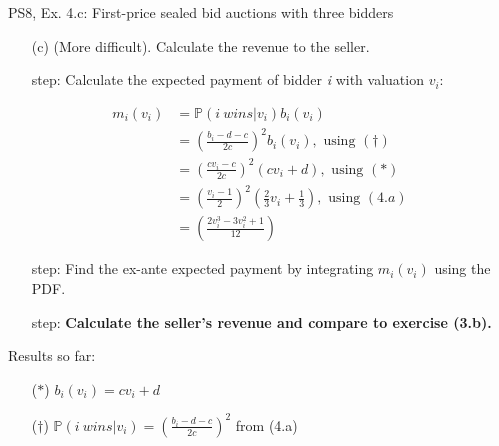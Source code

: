 \begin{frame}{PS8, Ex. 4.c: First-price sealed bid auctions with three bidders}
    \begin{itemize}
      \item[(c)] (More difficult). Calculate the revenue to the seller.
    \end{itemize}
    \vspace{-8pt}
    \begin{multicols}{2}
      \begin{itemize}
        \item[\nth{1} step:] Calculate the expected payment of bidder \textit{i} with valuation $v_i$:
      \end{itemize}
      \vspace{-10pt}
      \begin{align*}
        m_i(v_i)&=\mathbb{P}(i\ wins|v_i)b_i(v_i)\\
                &=\left(\frac{b_i-d-c}{2c}\right)^2b_i(v_i),\text{ using }(\dagger)\\
                &=\left(\frac{cv_i-c}{2c}\right)^2(cv_i+d),\text{ using }(*)\\
                &=\left(\frac{v_i-1}{2}\right)^2\left(\frac{2}{3}v_i+\frac{1}{3}\right),\text{ using }(4.a)\\
                &=\left(\frac{2v_i^3-3v_i^2+1}{12}\right)
      \end{align*}
      \vspace{-10pt}
      \begin{itemize}
        \item[\nth{2} step:] Find the ex-ante expected payment by integrating $m_i(v_i)$ using the PDF.
      \end{itemize}
      \vspace{-4pt}
      \vspace{-4pt}
      \begin{itemize}
        \item[\nth{3} step:] \textbf{Calculate the seller's revenue and compare to exercise (3.b).}
      \end{itemize}
      \vfill\null\columnbreak
      Results so far:
      \vspace{-6pt}
      \begin{itemize}
        \item[($*$)] $b_i(v_i) = cv_i+d$
        \item[($\dagger$)] $\mathbb{P}(i\ wins|v_i)=\left(\frac{b_i-d-c}{2c}\right)^2$ from (4.a)

\end{itemize}
\end{multicols}
\end{frame}
